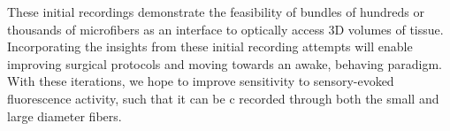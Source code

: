 These initial recordings demonstrate the feasibility of bundles of 
hundreds or thousands of microfibers as an interface to optically 
access 3D volumes of tissue. Incorporating the insights from these 
initial recording attempts will enable improving surgical protocols 
and moving towards an awake, behaving paradigm. With these iterations,
 we hope to improve sensitivity to sensory-evoked fluorescence 
activity, such that it can be c recorded through both the 
small and large diameter fibers.


